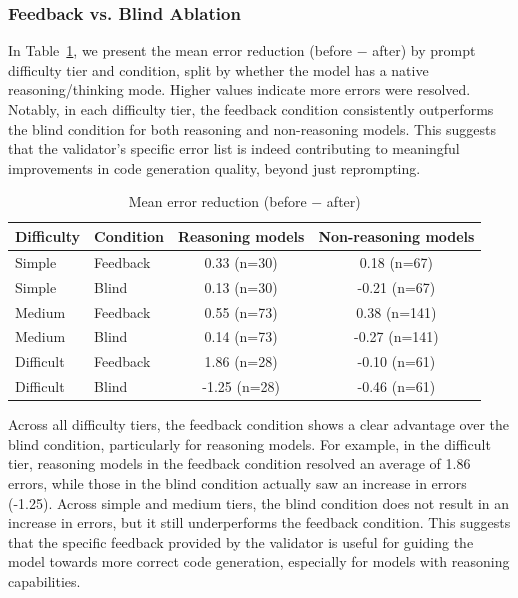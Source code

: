\subsubsection{Feedback vs. Blind Ablation}


In Table~\ref{tab:rq1-feedback-vs-blind-reasoning}, we present the mean error reduction (before $-$ after) by prompt difficulty tier and condition, split by whether the model has a native reasoning/thinking mode. Higher values indicate more errors were resolved. Notably, in each difficulty tier, the feedback condition consistently outperforms the blind condition for both reasoning and non-reasoning models. This suggests that the validator's specific error list is indeed contributing to meaningful improvements in code generation quality, beyond just reprompting.

\begin{table}[H]
	\centering
	\begin{tabular}{ll cc}
		\toprule
		Difficulty & Condition & Reasoning models & Non-reasoning models \\
		\midrule
		Simple     & Feedback  & 0.33 (n=30)      & 0.18 (n=67)          \\
		Simple     & Blind     & 0.13 (n=30)      & -0.21 (n=67)         \\
		\addlinespace
		Medium     & Feedback  & 0.55 (n=73)      & 0.38 (n=141)         \\
		Medium     & Blind     & 0.14 (n=73)      & -0.27 (n=141)        \\
		\addlinespace
		Difficult  & Feedback  & 1.86 (n=28)      & -0.10 (n=61)         \\
		Difficult  & Blind     & -1.25 (n=28)     & -0.46 (n=61)         \\
		\bottomrule
	\end{tabular}
	\vspace{0.5em}
	\caption{Mean error reduction (before $-$ after)}
	\label{tab:rq1-feedback-vs-blind-reasoning}
\end{table}

Across all difficulty tiers, the feedback condition shows a clear advantage over the blind condition, particularly for reasoning models. For example, in the difficult tier, reasoning models in the feedback condition resolved an average of 1.86 errors, while those in the blind condition actually saw an increase in errors (-1.25). Across simple and medium tiers, the blind condition does not result in an increase in errors, but it still underperforms the feedback condition. This suggests that the specific feedback provided by the validator is useful for guiding the model towards more correct code generation, especially for models with reasoning capabilities.

